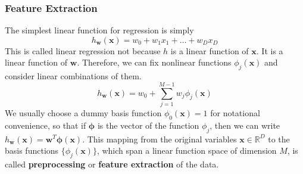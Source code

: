 \documentclass{article}
\theoremstyle{definition}
\theoremstyle{remark}
\theoremstyle{definition}
\begin{document}
\subsubsection{Feature Extraction}

The simplest linear function for regression is simply 
\[h_\mathbf{w} (\mathbf{x}) = w_0 + w_1 x_1 + \ldots + w_D x_D\]
This is called linear regression not because $h$ is a linear function of $\mathbf{x}$. It is a linear function of $\mathbf{w}$. Therefore, we can fix nonlinear functions $\phi_j (\mathbf{x})$ and consider linear combinations of them. 
\[h_\mathbf{w} (\mathbf{x}) = w_0 + \sum_{j=1}^{M-1} w_j \phi_j (\mathbf{x})\]
We usually choose a dummy basis function $\phi_0 (\mathbf{x}) = 1$ for notational convenience, so that if $\boldsymbol{\phi}$ is the vector of the function $\phi_j$, then we can write $h_\mathbf{w} (\mathbf{x}) = \mathbf{w}^T \boldsymbol{\phi} (\mathbf{x})$. This mapping from the original variables $\mathbf{x} \in \mathbb{R}^D$ to the basis functions $\{\phi_j (\mathbf{x})\}$, which span a linear function space of dimension $M$, is called \textbf{preprocessing} or \textbf{feature extraction} of the data. 
\end{document}
